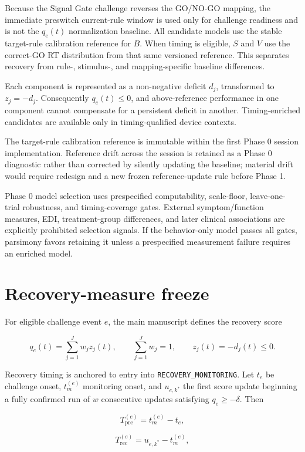 \documentclass[man]{apa7}
\begin{document}
Because the Signal Gate challenge reverses the GO/NO-GO mapping, the immediate preswitch current-rule window is used only for challenge readiness and is not the \(q_e(t)\) normalization baseline. All candidate models use the stable target-rule calibration reference for \(B\). When timing is eligible, \(S\) and \(V\) use the correct-GO RT distribution from that same versioned reference. This separates recovery from rule-, stimulus-, and mapping-specific baseline differences.

Each component is represented as a non-negative deficit \(d_j\), transformed to \(z_j=-d_j\). Consequently \(q_e(t)\le 0\), and above-reference performance in one component cannot compensate for a persistent deficit in another. Timing-enriched candidates are available only in timing-qualified device contexts.

The target-rule calibration reference is immutable within the first Phase 0 session implementation. Reference drift across the session is retained as a Phase 0 diagnostic rather than corrected by silently updating the baseline; material drift would require redesign and a new frozen reference-update rule before Phase 1.

Phase 0 model selection uses prespecified computability, scale-floor, leave-one-trial robustness, and timing-coverage gates. External symptom/function measures, EDI, treatment-group differences, and later clinical associations are explicitly prohibited selection signals. If the behavior-only model passes all gates, parsimony favors retaining it unless a prespecified measurement failure requires an enriched model.

\section{Recovery-measure freeze}

For eligible challenge event \(e\), the main manuscript defines the recovery score

\[
q_e(t)
=
\sum_{j=1}^{J} w_j z_j(t),
\qquad
\sum_{j=1}^{J}w_j=1,
\qquad
z_j(t)=-d_j(t)\le 0.
\]

Recovery timing is anchored to entry into \texttt{RECOVERY\_MONITORING}. Let \(t_e\) be challenge onset, \(t_m^{(e)}\) monitoring onset, and \(u_{e,k^\ast}\) the first score update beginning a fully confirmed run of \(w\) consecutive updates satisfying \(q_e\ge-\delta\). Then

\[
T_{\mathrm{pre}}^{(e)}=t_m^{(e)}-t_e,
\]

\[
T_{\mathrm{rec}}^{(e)}=u_{e,k^\ast}-t_m^{(e)},
\]
\end{document}
